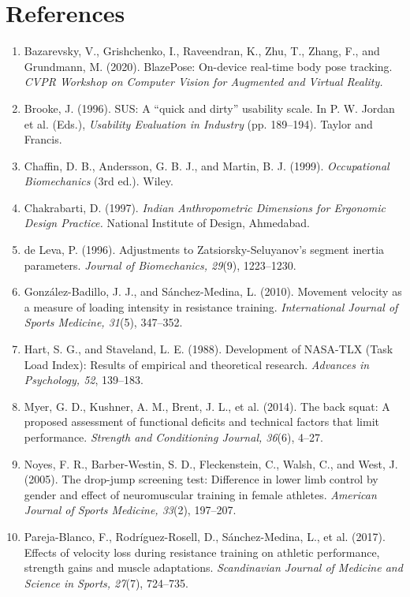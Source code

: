 \documentclass[12pt]{article}
\begin{document}
\section*{References}
\footnotesize
\begin{enumerate}
\setlength{\itemsep}{2pt}
\item Bazarevsky, V., Grishchenko, I., Raveendran, K., Zhu, T., Zhang, F., and Grundmann, M. (2020). BlazePose: On-device real-time body pose tracking. \emph{CVPR Workshop on Computer Vision for Augmented and Virtual Reality.}
\item Brooke, J. (1996). SUS: A ``quick and dirty'' usability scale. In P. W. Jordan et al. (Eds.), \emph{Usability Evaluation in Industry} (pp. 189--194). Taylor and Francis.
\item Chaffin, D. B., Andersson, G. B. J., and Martin, B. J. (1999). \emph{Occupational Biomechanics} (3rd ed.). Wiley.
\item Chakrabarti, D. (1997). \emph{Indian Anthropometric Dimensions for Ergonomic Design Practice.} National Institute of Design, Ahmedabad.
\item de Leva, P. (1996). Adjustments to Zatsiorsky-Seluyanov's segment inertia parameters. \emph{Journal of Biomechanics, 29}(9), 1223--1230.
\item Gonz\'alez-Badillo, J. J., and S\'anchez-Medina, L. (2010). Movement velocity as a measure of loading intensity in resistance training. \emph{International Journal of Sports Medicine, 31}(5), 347--352.
\item Hart, S. G., and Staveland, L. E. (1988). Development of NASA-TLX (Task Load Index): Results of empirical and theoretical research. \emph{Advances in Psychology, 52}, 139--183.
\item Myer, G. D., Kushner, A. M., Brent, J. L., et al. (2014). The back squat: A proposed assessment of functional deficits and technical factors that limit performance. \emph{Strength and Conditioning Journal, 36}(6), 4--27.
\item Noyes, F. R., Barber-Westin, S. D., Fleckenstein, C., Walsh, C., and West, J. (2005). The drop-jump screening test: Difference in lower limb control by gender and effect of neuromuscular training in female athletes. \emph{American Journal of Sports Medicine, 33}(2), 197--207.
\item Pareja-Blanco, F., Rodr\'iguez-Rosell, D., S\'anchez-Medina, L., et al. (2017). Effects of velocity loss during resistance training on athletic performance, strength gains and muscle adaptations. \emph{Scandinavian Journal of Medicine and Science in Sports, 27}(7), 724--735.

\end{enumerate}
\end{document}
